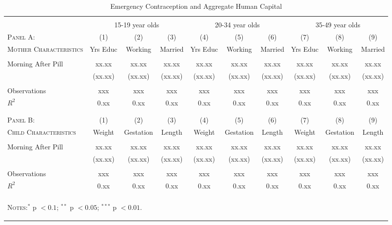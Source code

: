 \begin{landscape}
\begin{table}[htpb!]\centering
\caption{Emergency Contraception and Aggregate Human Capital} 
\label{TEENtab:PillAgg}
\begin{tabular}{@{\extracolsep{5pt}}lccccccccc} 
\\[-1.8ex]\hline\hline \\[-1.8ex] 
&\multicolumn{3}{c}{15-19 year olds} &\multicolumn{3}{c}{20-34 year olds} 
&\multicolumn{3}{c}{35-49 year olds} 
\\ \cmidrule(r){2-4} \cmidrule(r){5-7} \cmidrule(r){8-10}
\textsc{Panel A:}&(1)&(2)&(3)&(4)&(5)&(6)&(7)&(8)&(9) \\
\textsc{Mother Characteristics} & Yrs Educ & Working & Married& Yrs Educ & Working & Married & Yrs Educ & Working & Married\\ \midrule
 & & & & & & & & & \\
Morning After Pill & xx.xx&xx.xx&xx.xx&xx.xx&xx.xx&xx.xx&xx.xx&xx.xx&xx.xx \\
& (xx.xx)&(xx.xx)&(xx.xx)&(xx.xx)&(xx.xx)&(xx.xx)&(xx.xx)&(xx.xx)&(xx.xx) \\
 & & & & & & & & & \\
Observations & xxx&xxx&xxx&xxx&xxx&xxx&xxx&xxx&xxx\\
$ R^2 $ & 0.xx&0.xx&0.xx&0.xx&0.xx&0.xx&0.xx&0.xx&0.xx \\ 
 & & & & & & & & & \\
 & & & & & & & & & \\ \midrule
\textsc{Panel B:}&(1)&(2)&(3)&(4)&(5)&(6)&(7)&(8)&(9) \\
\textsc{Child Characteristics} & Weight & Gestation & Length& Weight & Gestation & Length & Weight & Gestation & Length\\ \midrule
 & & & & & & & & & \\
Morning After Pill & xx.xx&xx.xx&xx.xx&xx.xx&xx.xx&xx.xx&xx.xx&xx.xx&xx.xx \\
& (xx.xx)&(xx.xx)&(xx.xx)&(xx.xx)&(xx.xx)&(xx.xx)&(xx.xx)&(xx.xx)&(xx.xx) \\
 & & & & & & & & & \\
Observations & xxx&xxx&xxx&xxx&xxx&xxx&xxx&xxx&xxx\\
$ R^2 $ & 0.xx&0.xx&0.xx&0.xx&0.xx&0.xx&0.xx&0.xx&0.xx \\ \hline \hline \\[-1.8ex]
\multicolumn{10}{p{21cm}}{\begin{footnotesize}\textsc{Notes:}$^{*}$ p $<0.1$; $^{**}$ p $<0.05$; $^{***}$ p $<0.01$.\end{footnotesize}}
\normalsize\end{tabular}\end{table}\end{landscape}
